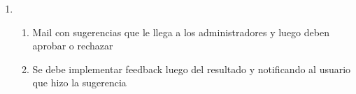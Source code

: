 \documentclass[12pt, letterpaper, notitlepage]{article}
\begin{document}
\begin{enumerate}
		\item {}
		\begin{enumerate}
			\item Mail con sugerencias que le llega a los administradores y luego deben aprobar o rechazar
			\item Se debe implementar feedback luego del resultado y notificando al usuario que hizo la sugerencia
		\end{enumerate}			
		
	\end{enumerate}
	
	
	
	
\end{document}
